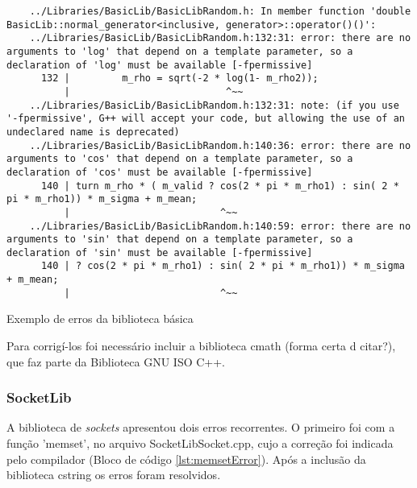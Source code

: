 \begin{listing}[!ht]
    \begin{verbatim}
    ../Libraries/BasicLib/BasicLibRandom.h: In member function 'double BasicLib::normal_generator<inclusive, generator>::operator()()':
    ../Libraries/BasicLib/BasicLibRandom.h:132:31: error: there are no arguments to 'log' that depend on a template parameter, so a declaration of 'log' must be available [-fpermissive]
      132 |         m_rho = sqrt(-2 * log(1- m_rho2));
          |                           ^~~
    ../Libraries/BasicLib/BasicLibRandom.h:132:31: note: (if you use '-fpermissive', G++ will accept your code, but allowing the use of an undeclared name is deprecated)
    ../Libraries/BasicLib/BasicLibRandom.h:140:36: error: there are no arguments to 'cos' that depend on a template parameter, so a declaration of 'cos' must be available [-fpermissive]
      140 | turn m_rho * ( m_valid ? cos(2 * pi * m_rho1) : sin( 2 * pi * m_rho1)) * m_sigma + m_mean;
          |                          ^~~
    ../Libraries/BasicLib/BasicLibRandom.h:140:59: error: there are no arguments to 'sin' that depend on a template parameter, so a declaration of 'sin' must be available [-fpermissive]
      140 | ? cos(2 * pi * m_rho1) : sin( 2 * pi * m_rho1)) * m_sigma + m_mean;
          |                          ^~~
    \end{verbatim}
\caption{Exemplo de erros da biblioteca básica}
\label{lst:mathError}
\end{listing}
        

Para corrigí-los foi necessário incluir a biblioteca cmath (forma certa d citar?), 
que faz parte da Biblioteca GNU ISO C++.

\subsubsection{SocketLib}

A biblioteca de \textit{sockets} apresentou dois erros recorrentes. O primeiro foi com a função 'memset',
no arquivo SocketLibSocket.cpp, cujo a correção foi indicada pelo compilador (Bloco de código \ref{lst:memsetError}). 
Após a inclusão da biblioteca cstring os erros foram resolvidos.

